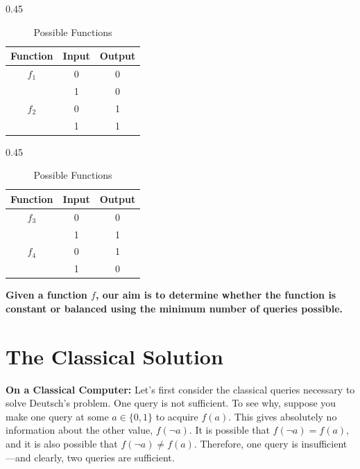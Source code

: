 \begin{table}[ht]
    \centering
    \begin{subtable}[b]{0.45\linewidth}
        \centering
        \begin{tabular}{|c|c|c|}
            \hline
            Function & Input & Output \\
            \hline
            $f_1$ & 0 & 0 \\
                 & 1 & 0 \\
            \hline
            $f_2$ & 0 & 1 \\
                 & 1 & 1 \\
            \hline
        \end{tabular}
        \caption{Constant Functions}
    \end{subtable}%
    \hfill
    \begin{subtable}[b]{0.45\linewidth}
        \centering
        \begin{tabular}{|c|c|c|}
            \hline
            Function & Input & Output \\
            \hline
            $f_3$ & 0 & 0 \\
                 & 1 & 1 \\
            \hline
            $f_4$ & 0 & 1 \\
                 & 1 & 0 \\
            \hline
        \end{tabular}
        \caption{Balanced Functions}
    \end{subtable}
    \caption{Possible Functions}
    \label{tab:Deutsch}
\end{table}

\textbf{Given a function $f$, our aim is to determine whether the function is constant or balanced using the minimum number of queries possible.}


\section{The Classical Solution}

\textbf{On a Classical Computer:} Let's first consider the classical queries necessary to solve Deutsch's problem. One query is not sufficient. To see why, suppose you make one query at some $a \in \{0,1\}$ to acquire $f(a)$. This gives absolutely no information about the other value, $f(\neg a)$. It is possible that $f(\neg a) = f(a)$, and it is also possible that $f(\neg a) \neq f(a)$. Therefore, one query is insufficient---and clearly, two queries are sufficient.

